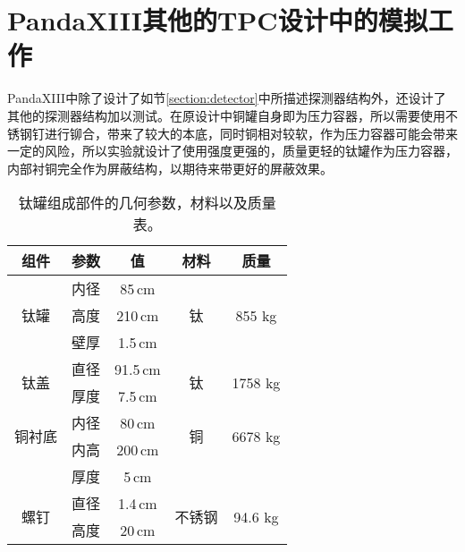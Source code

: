 
\chapter{PandaXIII其他的TPC设计中的模拟工作}

PandaXIII中除了设计了如节\ref{section:detector}中所描述探测器结构外，还设计了其他的探测器结构加以测试。在原设计中铜罐自身即为压力容器，所以需要使用不锈钢钉进行铆合，带来了较大的本底，同时铜相对较软，作为压力容器可能会带来一定的风险，所以实验就设计了使用强度更强的，质量更轻的钛罐作为压力容器，内部衬铜完全作为屏蔽结构，以期待来带更好的屏蔽效果。
\renewcommand\arraystretch{1.2}
\begin{table*}[hbt]
    \begin{center}
        \begin{tabular*}{0.75\textwidth}{@{\extracolsep{\fill}}ccccc}
        \hline
        \hline
        \textbf{组件}   &   \textbf{参数}   &   \textbf{值} &   \textbf{材料} & \textbf{质量} \\ \hline
        \multirow{3}{*}{钛罐} 
            &   内径&   85\,cm&     \multirow{3}{*}{钛} &   \multirow{3}{*}{855 kg} \\
            &   高度&   210\,cm&    &   \\   
            &   壁厚&   1.5\,cm&    &   \\\hline
        \multirow{2}{*}{钛盖} 
            & 直径 & 91.5\,cm & \multirow{2}{*}{钛} & \multirow{2}{*}{1758 kg} \\
            & 厚度 & 7.5\,cm &  &    \\\hline
        \multirow{2}{*}{铜衬底} 
            & 内径 & 80\,cm & \multirow{2}{*}{铜} & \multirow{2}{*}{6678 kg} \\
            & 内高 & 200\,cm &  &    \\
            & 厚度 & 5\,cm &  & \\\hline
        \multirow{2}{*}{螺钉} 
            & 直径 & 1.4\,cm & \multirow{2}{*}{不锈钢} & \multirow{2}{*}{94.6 kg} \\
            & 高度 & 20\,cm &  &    \\
        \hline
        \hline
        \end{tabular*}
        \caption{钛罐组成部件的几何参数，材料以及质量表。\supercite{cdr}}
        \label{tab:ti_structure}
    \end{center}
\end{table*}

